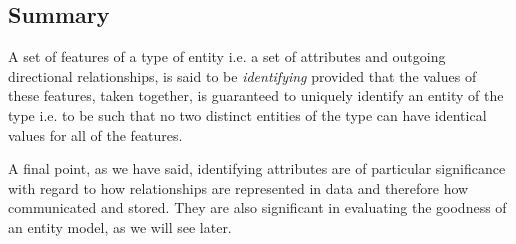 \subsection{Summary}
\mynote A set of features of a type of entity i.e. a set of attributes and outgoing directional relationships, is said to be \textit{identifying} provided that the values of these features,
taken together, is guaranteed to uniquely identify an entity of the type i.e. to be such that no two distinct entities of the type can have identical values for all of the features. 

\mynote A final point, as we have said, identifying attributes are of particular significance with regard to 
 how relationships are represented in data and therefore how communicated and stored.
They are also significant in evaluating the goodness of an entity model, as we will see later.